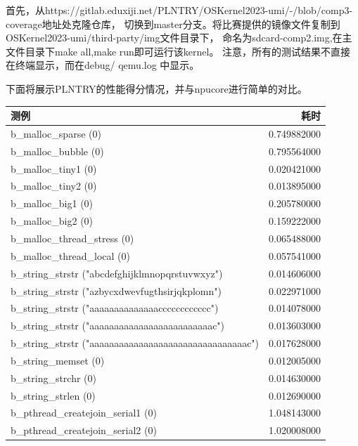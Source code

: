 首先，从https://gitlab.eduxiji.net/PLNTRY/OSKernel2023-umi/-/blob/comp3-coverage地址处克隆仓库，
切换到master分支。将比赛提供的镜像文件复制到OSKernel2023-umi/third-party/img文件目录下，
命名为sdcard-comp2.img,在主文件目录下make all,make run即可运行该kernel。
注意，所有的测试结果不直接在终端显示，而在debug/ qemu.log 中显示。

下面将展示PLNTRY的性能得分情况，并与npucore进行简单的对比。

\begin{table}[H]
    \centering
    \begin{tabular}{|l|r|}
        \hline
        测例 & 耗时 \\
        \hline
        b\_malloc\_sparse (0) & 0.749882000 \\
        \hline
        b\_malloc\_bubble (0) & 0.795564000 \\
        \hline
        b\_malloc\_tiny1 (0) & 0.020421000 \\
        \hline
        b\_malloc\_tiny2 (0) & 0.013895000 \\
        \hline
        b\_malloc\_big1 (0) & 0.205780000 \\
        \hline
        b\_malloc\_big2 (0) & 0.159222000 \\
        \hline
        b\_malloc\_thread\_stress (0) & 0.065488000 \\
        \hline
        b\_malloc\_thread\_local (0) & 0.057541000 \\
        \hline
        b\_string\_strstr ("abcdefghijklmnopqrstuvwxyz") & 0.014606000 \\
        \hline
        b\_string\_strstr ("azbycxdwevfugthsirjqkplomn") & 0.022971000 \\
        \hline
        b\_string\_strstr ("aaaaaaaaaaaaaacccccccccccc") & 0.014078000 \\
        \hline
        b\_string\_strstr ("aaaaaaaaaaaaaaaaaaaaaaaaac") & 0.013603000 \\
        \hline
        b\_string\_strstr ("aaaaaaaaaaaaaaaaaaaaaaaaaaaaaaaac") & 0.017628000 \\
        \hline
        b\_string\_memset (0) & 0.012005000 \\
        \hline
        b\_string\_strchr (0) & 0.014630000 \\
        \hline
        b\_string\_strlen (0) & 0.012690000 \\
        \hline
        b\_pthread\_createjoin\_serial1 (0) & 1.048143000 \\
        \hline
        b\_pthread\_createjoin\_serial2 (0) & 1.020008000 \\

\end{tabular}
\end{table}
